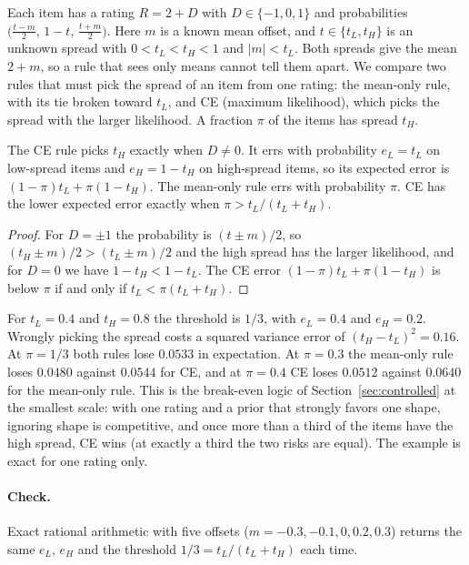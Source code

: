 Each item has a rating $R=2+D$ with $D\in\{-1,0,1\}$ and probabilities $\bigl(\tfrac{t-m}{2},\,1-t,\,\tfrac{t+m}{2}\bigr)$.
Here $m$ is a known mean offset, and $t\in\{t_L,t_H\}$ is an unknown spread with $0<t_L<t_H<1$ and $|m|<t_L$.
Both spreads give the mean $2+m$, so a rule that sees only means cannot tell them apart.
We compare two rules that must pick the spread of an item from one rating: the mean-only rule, with its tie broken toward $t_L$, and CE (maximum likelihood), which picks the spread with the larger likelihood.
A fraction $\pi$ of the items has spread $t_H$.

\begin{proposition}
\label{prop:threshold}
The CE rule picks $t_H$ exactly when $D\ne0$.
It errs with probability $e_L=t_L$ on low-spread items and $e_H=1-t_H$ on high-spread items, so its expected error is $(1-\pi)t_L+\pi(1-t_H)$.
The mean-only rule errs with probability $\pi$.
CE has the lower expected error exactly when $\pi>t_L/(t_L+t_H)$.
\end{proposition}

\begin{proof}
For $D=\pm1$ the probability is $(t\pm m)/2$, so $(t_H\pm m)/2>(t_L\pm m)/2$ and the high spread has the larger likelihood, and for $D=0$ we have $1-t_H<1-t_L$.
The CE error $(1-\pi)t_L+\pi(1-t_H)$ is below $\pi$ if and only if $t_L<\pi(t_L+t_H)$.
\end{proof}

For $t_L=0.4$ and $t_H=0.8$ the threshold is $1/3$, with $e_L=0.4$ and $e_H=0.2$.
Wrongly picking the spread costs a squared variance error of $(t_H-t_L)^2=0.16$.
At $\pi=1/3$ both rules lose $0.0533$ in expectation.
At $\pi=0.3$ the mean-only rule loses $0.0480$ against $0.0544$ for CE, and at $\pi=0.4$ CE loses $0.0512$ against $0.0640$ for the mean-only rule.
This is the break-even logic of Section~\ref{sec:controlled} at the smallest scale: with one rating and a prior that strongly favors one shape, ignoring shape is competitive, and once more than a third of the items have the high spread, CE wins (at exactly a third the two risks are equal).
The example is exact for one rating only.

\paragraph{Check.}
Exact rational arithmetic with five offsets ($m=-0.3,-0.1,0,0.2,0.3$) returns the same $e_L$, $e_H$ and the threshold $1/3=t_L/(t_L+t_H)$ each time.

